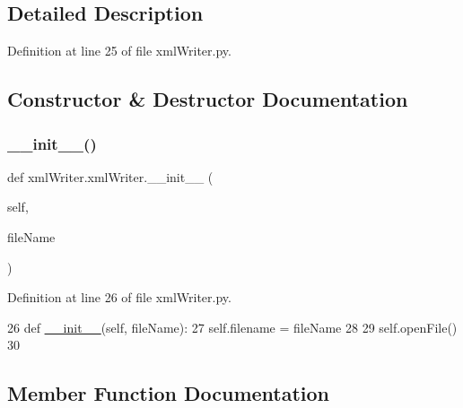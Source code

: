 \subsection{Detailed Description}


Definition at line 25 of file xml\+Writer.\+py.



\subsection{Constructor \& Destructor Documentation}
\mbox{\label{classxml_writer_1_1xml_writer_a0b43f6115153b244e10d1933ee33500a}} 
\subsubsection{\texorpdfstring{\+\_\+\+\_\+init\+\_\+\+\_\+()}{\_\_init\_\_()}}
{\footnotesize\ttfamily def xml\+Writer.\+xml\+Writer.\+\_\+\+\_\+init\+\_\+\+\_\+ (\begin{DoxyParamCaption}\item[{}]{self,  }\item[{}]{file\+Name }\end{DoxyParamCaption})}



Definition at line 26 of file xml\+Writer.\+py.


\begin{DoxyCode}
26     \textcolor{keyword}{def }\mbox{\hyperlink{classxml_writer_1_1xml_writer_a0b43f6115153b244e10d1933ee33500a}{\_\_init\_\_}}(self, fileName):
27         self.filename = fileName
28         
29         self.openFile()
30         
\end{DoxyCode}


\subsection{Member Function Documentation}
\mbox{\label{classxml_writer_1_1xml_writer_adfbe5387ec461435f294e98767cff534}} 
